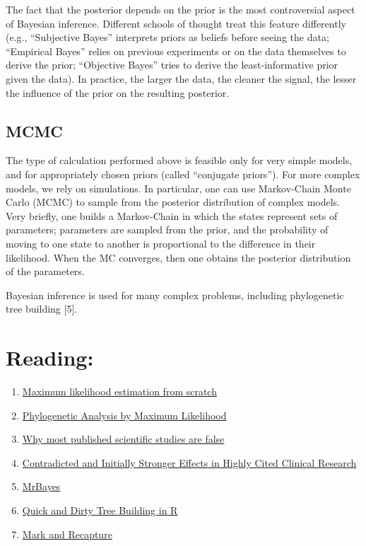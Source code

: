 \documentclass[
  letterpaper,
  DIV=11,
  numbers=noendperiod]{scrreprt}
\begin{document}
The fact that the posterior depends on the prior is the most
controversial aspect of Bayesian inference. Different schools of thought
treat this feature differently (e.g., ``Subjective Bayes'' interprets
priors as beliefs before seeing the data; ``Empirical Bayes'' relies on
previous experiments or on the data themselves to derive the prior;
``Objective Bayes'' tries to derive the least-informative prior given
the data). In practice, the larger the data, the cleaner the signal, the
lesser the influence of the prior on the resulting posterior.

\subsection{MCMC}\label{mcmc}

The type of calculation performed above is feasible only for very simple
models, and for appropriately chosen priors (called ``conjugate
priors''). For more complex models, we rely on simulations. In
particular, one can use Markov-Chain Monte Carlo (MCMC) to sample from
the posterior distribution of complex models. Very briefly, one builds a
Markov-Chain in which the states represent sets of parameters;
parameters are sampled from the prior, and the probability of moving to
one state to another is proportional to the difference in their
likelihood. When the MC converges, then one obtains the posterior
distribution of the parameters.

Bayesian inference is used for many complex problems, including
phylogenetic tree building {[}5{]}.

\section{Reading:}\label{reading}

\begin{enumerate}
\def\labelenumi{\arabic{enumi}.}
\item
  \href{https://www.r-bloggers.com/maximum-likelihood-estimation-from-scratch/}{Maximum
  likelihood estimation from scratch}
\item
  \href{https://academic.oup.com/mbe/article/24/8/1586/1103731}{Phylogenetic
  Analysis by Maximum Likelihood}
\item
  \href{https://journals.plos.org/plosmedicine/article?id=10.1371/journal.pmed.0020124}{Why
  most published scientific studies are false}
\item
  \href{https://jamanetwork.com/journals/jama/fullarticle/201218}{Contradicted
  and Initially Stronger Effects in Highly Cited Clinical Research}
\item
  \href{http://nbisweden.github.io/MrBayes/}{MrBayes}
\item
  \href{https://www.molecularecologist.com/2016/02/quick-and-dirty-tree-building-in-r/}{Quick
  and Dirty Tree Building in R}
\item
  \href{https://en.wikipedia.org/wiki/Mark_and_recapture}{Mark and
  Recapture}
\end{enumerate}
\end{document}
